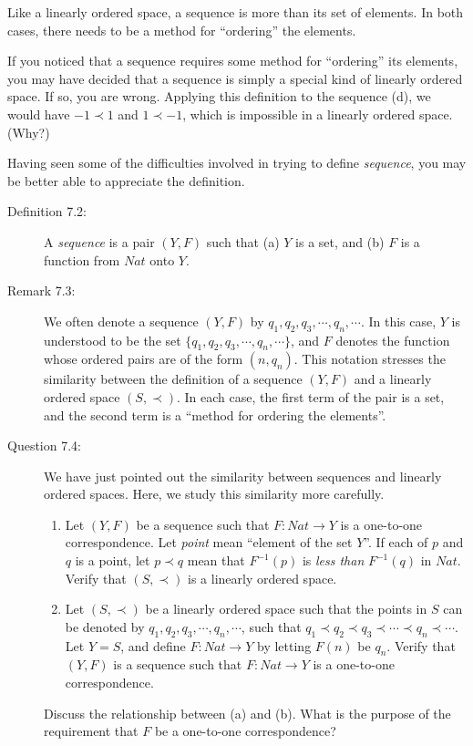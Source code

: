 \documentclass{book}
\begin{document}
Like a linearly ordered space, a sequence is more than its set of elements. In both cases, there needs to be a method for ``ordering'' the elements.

If you noticed that a sequence requires some method for ``ordering'' its elements, you may have decided that a sequence is simply a special kind of linearly ordered space. If so, you are wrong. Applying this definition to the sequence (d), we would have $-1 \prec 1$ and $1 \prec -1$, which is impossible in a linearly ordered space. (Why?)

Having seen some of the difficulties involved in trying to define \emph{sequence}, you may be better able to appreciate the definition.

\begin{description}

\item[Definition 7.2:] A \emph{sequence} is a pair $(Y, F)$ such that (a) $Y$ is a set, and (b) $F$ is a function from $Nat$ onto $Y$.

\item[Remark 7.3:] We often denote a sequence $(Y, F)$ by $q_{1}, q_{2}, q_{3}, \cdots, q_{n}, \cdots$. In this case, $Y$ is understood to be the set $\{ q_{1}, q_{2}, q_{3}, \cdots, q_{n}, \cdots \}$, and $F$ denotes the function whose ordered pairs are of the form $(n, q_{n})$. This notation stresses the similarity between the definition of a sequence $(Y, F)$ and a linearly ordered space $(S, \prec)$. In each case, the first term of the pair is a set, and the second term is a ``method for ordering the elements''.

\item[Question 7.4:] We have just pointed out the similarity between sequences and linearly ordered spaces. Here, we study this similarity more carefully.
\begin{enumerate}[\hspace{1cm}(a)]
  \item Let $(Y, F)$ be a sequence such that $F: Nat \rightarrow Y$ is a one-to-one correspondence. Let \emph{point} mean ``element of the set $Y$''. If each of $p$ and $q$ is a point, let $p \prec q$ mean that $F^{-1}(p)$ is \emph{less than} $F^{-1}(q)$ in $Nat$. Verify that $(S, \prec)$ is a linearly ordered space.
  \item Let $(S, \prec)$ be a linearly ordered space such that the points in $S$ can be denoted by $q_{1}, q_{2}, q_{3}, \cdots, q_{n}, \cdots$, such that $q_{1} \prec q_{2} \prec q_{3} \prec \cdots \prec q_{n} \prec \cdots$. Let $Y = S$, and define $F: Nat \rightarrow Y$ by letting $F(n)$ be $q_{n}$. Verify that $(Y, F)$ is a sequence such that $F: Nat \rightarrow Y$ is a one-to-one correspondence.
\end{enumerate}
Discuss the relationship between (a) and (b). What is the purpose of the requirement that $F$ be a one-to-one correspondence?


\end{description}
\end{document}

